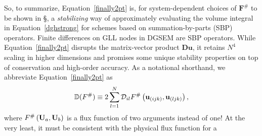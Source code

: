So, to summarize, Equation~\ref{finally2pt} is, for system-dependent choices of
$\mathbf{F}^{\#}$ to be shown in \S, a \emph{stabilizing} way of approximately
evaluating the volume integral in Equation~\ref{dghstrong} for schemes based on
summation-by-parts (SBP) operators. Finite differences on GLL nodes in DGSEM are
SBP operators. While Equation~\ref{finally2pt} disrupts the matrix-vector
product $\mathbf{Du}$, it retains $N^4$ scaling in higher dimensions and promises
some unique stability properties on top of conservation and high-order accuracy\cite{walchidk}.
As a notational shorthand, we abbreviate Equation~\ref{finally2pt} as
\begin{equation}
\mathbb{D}(F^{\#})\equiv 2
\sum_{l=1}^N\mathcal{D}_{il}F^{\#}\left({\bf u}_{(ijk)},{\bf u}_{(ljk)}\right),
\label{theotherd}
\end{equation}
where $F^{\#}\left({\bf U}_a,{\bf U}_b\right)$ is a flux function of two arguments instead of one!
At the very least, it must be consistent with the physical flux function for a

